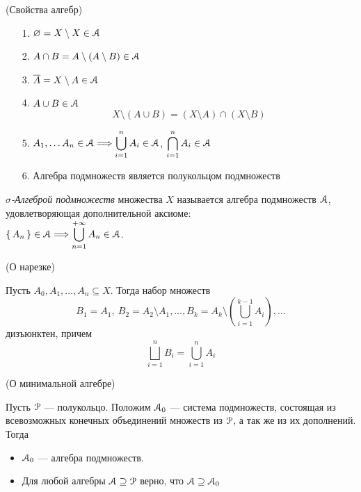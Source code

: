 \begin{theorem}(Свойства алгебр)
    \begin{itemize}
        \item[1.] $\varnothing = X \setminus X \in \mathcal{A}$
        \item[2.] $A \cap B = A \setminus (A \setminus B) \in \mathcal{A}$
        \item[3.] $\overline{A} = X \setminus A \in \mathcal{A}$
        \item[4.] $A \cup B \in \mathcal{A}$
\[
        X \setminus (A \cup B) = (X \setminus A) \cap (X \setminus B)
\]
        \item[5.] $\displaystyle A_1, \ldots A_n \in \mathcal{A} \Longrightarrow \bigcup_{i = 1}^{n}{A_i} \in
        \mathcal{A}$, $\displaystyle \bigcap_{i = 1}^{n}{A_i} \in \mathcal{A}$
        \item[6.] Алгебра подмножеств является полукольцом подмножеств
    \end{itemize}
\end{theorem}

\begin{definition}
    \textit{$\sigma$-Алгеброй подмножеств} множества $X$ называется алгебра
    подмножеств $\mathcal{A}$, удовлетворяющая дополнительной аксиоме: \\
    $\displaystyle \{\,A_n\,\} \in \mathcal{A} \Longrightarrow \bigcup_{n = 1}^{+\infty}{A_n} \in \mathcal{A}$.
\end{definition}

\begin{lemma}(О нарезке)

    Пусть $A_0, A_1, \ldots, A_n \subseteq X$. Тогда набор множеств
\[
    B_1 = A_1,~ B_2 = A_2 \setminus A_1, \ldots, B_k = A_k \setminus
        \left (\bigcup_{i = 1}^{k - 1}{A_i} \right), \ldots
\]
    дизъюнктен, причем
\[
    \bigsqcup_{i = 1}^{n}{B_i} = \bigcup_{i = 1}^{n}{A_i}
\]
\end{lemma}

\begin{lemma}(О минимальной алгебре)

    Пусть $\mathcal{P}$ --- полукольцо. Положим $\mathcal{A}_0$ --- система подмножеств,
    состоящая из всевозможных конечных объединений множеств из $\mathcal{P}$, а так
    же из их дополнений. Тогда
    \begin{itemize}
        \item $\mathcal{A}_0$ --- алгебра подмножеств.
        \item Для любой алгебры $\mathcal{A} \supseteq \mathcal{P}$ верно, что $\mathcal{A} \supseteq \mathcal{A}_0$
    \end{itemize}
\end{lemma}

